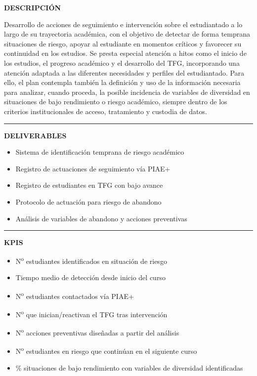 \documentclass[11pt,a4paper]{scrreprt}
\newcommand{\fieldlabel}[1]{%
  {\footnotesize\sffamily\bfseries\color{mutedcolor}\MakeUppercase{#1}}\par\nopagebreak[4]
}
\newcommand{\fieldsep}{\vspace{3pt}\noindent\textcolor{bordercolor}{\rule{\linewidth}{0.4pt}}\vspace{3pt}\par}
\begin{document}
\begin{tcolorbox}[pabox={e360color}{PA2.2 \enspace\textbullet\enspace Seguimiento e intervención con el estudiantado a lo largo de su trayectoria}]
\fieldlabel{Descripci\'on}
{\small Desarrollo de acciones de seguimiento e intervención sobre el estudiantado a lo largo de su trayectoria académica, con el objetivo de detectar de forma temprana situaciones de riesgo, apoyar al estudiante en momentos críticos y favorecer su continuidad en los estudios. Se presta especial atención a hitos como el inicio de los estudios, el progreso académico y el desarrollo del TFG, incorporando una atención adaptada a las diferentes necesidades y perfiles del estudiantado. Para ello, el plan contempla también la definición y uso de la información necesaria para analizar, cuando proceda, la posible incidencia de variables de diversidad en situaciones de bajo rendimiento o riesgo académico, siempre dentro de los criterios institucionales de acceso, tratamiento y custodia de datos. }\par
\fieldsep
\fieldlabel{Deliverables}
{\small \begin{itemize}[noitemsep,topsep=2pt]
\item Sistema de identificación temprana de riesgo académico
\item Registro de actuaciones de seguimiento vía PIAE+
\item Registro de estudiantes en TFG con bajo avance
\item Protocolo de actuación para riesgo de abandono
\item Análisis de variables de abandono y acciones preventivas
\end{itemize}}\par
\fieldsep
\fieldlabel{KPIs}
{\small \begin{itemize}[noitemsep,topsep=2pt]
\item N\textsuperscript{o} estudiantes identificados en situación de riesgo
\item Tiempo medio de detección desde inicio del curso
\item N\textsuperscript{o} estudiantes contactados vía PIAE+
\item N\textsuperscript{o} que inician/reactivan el TFG tras intervención
\item N\textsuperscript{o} acciones preventivas diseñadas a partir del análisis
\item N\textsuperscript{o} estudiantes en riesgo que continúan en el siguiente curso
\item \% situaciones de bajo rendimiento con variables de diversidad identificadas
\end{itemize}}\par
\end{tcolorbox}
\end{document}
